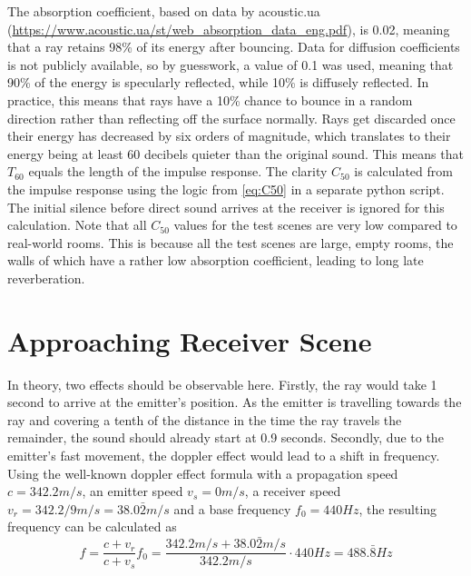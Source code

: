 The absorption coefficient, based on data by acoustic.ua (\url{https://www.acoustic.ua/st/web_absorption_data_eng.pdf}),
is 0.02, meaning that a ray retains 98\% of its energy after bouncing.
Data for diffusion coefficients is not publicly available, so by guesswork, a value of 0.1 was used,
meaning that 90\% of the energy is specularly reflected, while 10\% is diffusely reflected.
In practice, this means that rays have a 10\% chance to bounce in a random direction rather than reflecting off the surface normally.
\newline
Rays get discarded once their energy has decreased by six orders of magnitude,
which translates to their energy being at least 60 decibels quieter than the original sound.
This means that \(T_{60}\) equals the length of the impulse response.
The clarity \(C_{50}\) is calculated from the impulse response using the logic from \ref{eq:C50}
in a separate python script.
The initial silence before direct sound arrives at the receiver is ignored for this calculation.
\newline
Note that all \(C_{50}\) values for the test scenes are very low compared to real-world rooms.
This is because all the test scenes are large, empty rooms,
the walls of which have a rather low absorption coefficient,
leading to long late reverberation.

\section{Approaching Receiver Scene}

In theory, two effects should be observable here.
\newline
Firstly, the ray would take 1 second to arrive at the emitter's position.
As the emitter is travelling towards the ray and covering a tenth of the distance in the time the ray travels the remainder,
the sound should already start at 0.9 seconds.
\newline
Secondly, due to the emitter's fast movement,
the doppler effect would lead to a shift in frequency.
\newline
Using the well-known doppler effect formula with a propagation speed \(c = 342.2 m/s\), an emitter speed \(v_s = 0 m/s\),
a receiver speed \(v_r = 342.2/9 m/s = 38.0\bar{2} m/s\) and a base frequency \(f_0 = 440 Hz\),
the resulting frequency can be calculated as
\begin{equation}\label{eq:Doppler}
    f = \frac{c + v_r}{c + v_s} f_0 = \frac{342.2 m/s + 38.0\bar{2} m/s}{342.2 m/s} \cdot 440Hz = 488.\bar{8} Hz
\end{equation}

